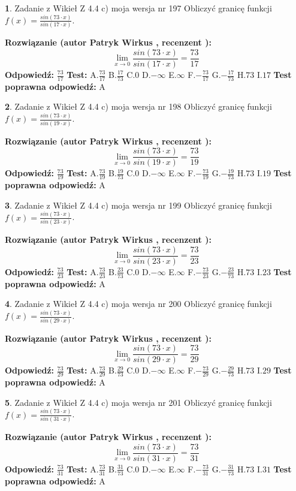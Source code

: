 \documentclass[12pt, a4paper]{article}
\theoremstyle{definition} %
\newtheorem{zad}{}
\newcommand{\zadStart}[1]{\begin{zad}#1\newline}
\newcommand{\zadStop}{\end{zad}}
\newcommand{\rozwStart}[2]{\noindent \textbf{Rozwiązanie (autor #1 , recenzent #2): }\newline}
\newcommand{\rozwStop}{\newline}
\newcommand{\odpStart}{\noindent \textbf{Odpowiedź:}\newline}
\newcommand{\odpStop}{\newline}
\newcommand{\testStart}{\noindent \textbf{Test:}\newline}
\newcommand{\testStop}{\newline}
\newcommand{\kluczStart}{\noindent \textbf{Test poprawna odpowiedź:}\newline}
\newcommand{\kluczStop}{\newline}
\begin{document}
\zadStart{Zadanie z Wikieł Z 4.4 c) moja wersja nr 197}
Obliczyć granicę funkcji $f(x)=\frac{sin(73\cdot x)}{sin(17\cdot x)}$.
\zadStop
\rozwStart{Patryk Wirkus}{}
$$\lim\limits_{x\to 0}\frac{sin(73\cdot x)}{sin(17\cdot x)}=
\frac{73}{17}$$
\rozwStop
\odpStart
$\frac{73}{17}$
\odpStop
\testStart
A.$\frac{73}{17}$
B.$\frac{17}{73}$
C.$0$
D.$-\infty$
E.$\infty$
F.$-\frac{73}{17}$
G.$-\frac{17}{73}$
H.$73$
I.$17$
\testStop
\kluczStart
A
\kluczStop



\zadStart{Zadanie z Wikieł Z 4.4 c) moja wersja nr 198}
Obliczyć granicę funkcji $f(x)=\frac{sin(73\cdot x)}{sin(19\cdot x)}$.
\zadStop
\rozwStart{Patryk Wirkus}{}
$$\lim\limits_{x\to 0}\frac{sin(73\cdot x)}{sin(19\cdot x)}=
\frac{73}{19}$$
\rozwStop
\odpStart
$\frac{73}{19}$
\odpStop
\testStart
A.$\frac{73}{19}$
B.$\frac{19}{73}$
C.$0$
D.$-\infty$
E.$\infty$
F.$-\frac{73}{19}$
G.$-\frac{19}{73}$
H.$73$
I.$19$
\testStop
\kluczStart
A
\kluczStop



\zadStart{Zadanie z Wikieł Z 4.4 c) moja wersja nr 199}
Obliczyć granicę funkcji $f(x)=\frac{sin(73\cdot x)}{sin(23\cdot x)}$.
\zadStop
\rozwStart{Patryk Wirkus}{}
$$\lim\limits_{x\to 0}\frac{sin(73\cdot x)}{sin(23\cdot x)}=
\frac{73}{23}$$
\rozwStop
\odpStart
$\frac{73}{23}$
\odpStop
\testStart
A.$\frac{73}{23}$
B.$\frac{23}{73}$
C.$0$
D.$-\infty$
E.$\infty$
F.$-\frac{73}{23}$
G.$-\frac{23}{73}$
H.$73$
I.$23$
\testStop
\kluczStart
A
\kluczStop



\zadStart{Zadanie z Wikieł Z 4.4 c) moja wersja nr 200}
Obliczyć granicę funkcji $f(x)=\frac{sin(73\cdot x)}{sin(29\cdot x)}$.
\zadStop
\rozwStart{Patryk Wirkus}{}
$$\lim\limits_{x\to 0}\frac{sin(73\cdot x)}{sin(29\cdot x)}=
\frac{73}{29}$$
\rozwStop
\odpStart
$\frac{73}{29}$
\odpStop
\testStart
A.$\frac{73}{29}$
B.$\frac{29}{73}$
C.$0$
D.$-\infty$
E.$\infty$
F.$-\frac{73}{29}$
G.$-\frac{29}{73}$
H.$73$
I.$29$
\testStop
\kluczStart
A
\kluczStop



\zadStart{Zadanie z Wikieł Z 4.4 c) moja wersja nr 201}
Obliczyć granicę funkcji $f(x)=\frac{sin(73\cdot x)}{sin(31\cdot x)}$.
\zadStop
\rozwStart{Patryk Wirkus}{}
$$\lim\limits_{x\to 0}\frac{sin(73\cdot x)}{sin(31\cdot x)}=
\frac{73}{31}$$
\rozwStop
\odpStart
$\frac{73}{31}$
\odpStop
\testStart
A.$\frac{73}{31}$
B.$\frac{31}{73}$
C.$0$
D.$-\infty$
E.$\infty$
F.$-\frac{73}{31}$
G.$-\frac{31}{73}$
H.$73$
I.$31$
\testStop
\kluczStart
A
\kluczStop
\end{document}
